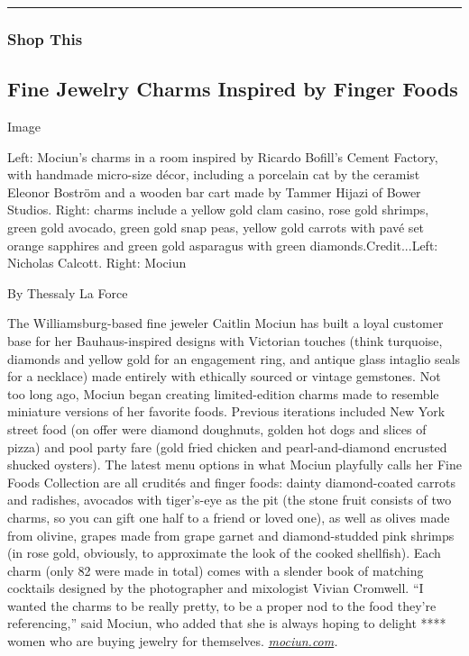 \begin{center}\rule{0.5\linewidth}{\linethickness}\end{center}

\hypertarget{shop-this}{%
\subsubsection{Shop This}\label{shop-this}}

\hypertarget{fine-jewelry-charms-inspired-by-finger-foods}{%
\subsection{Fine Jewelry Charms Inspired by Finger
Foods}\label{fine-jewelry-charms-inspired-by-finger-foods}}

Image

Left: Mociun's charms in a room inspired by Ricardo Bofill's Cement
Factory, with handmade micro-size décor, including a porcelain cat by
the ceramist Eleonor Boström and a wooden bar cart made by Tammer Hijazi
of Bower Studios. Right: charms include a yellow gold clam casino, rose
gold shrimps, green gold avocado, green gold snap peas, yellow gold
carrots with pavé set orange sapphires and green gold asparagus with
green diamonds.Credit...Left: Nicholas Calcott. Right: Mociun

By Thessaly La Force

The Williamsburg-based fine jeweler Caitlin Mociun has built a loyal
customer base for her Bauhaus-inspired designs with Victorian touches
(think turquoise, diamonds and yellow gold for an engagement ring, and
antique glass intaglio seals for a necklace) made entirely with
ethically sourced or vintage gemstones. Not too long ago, Mociun began
creating limited-edition charms made to resemble miniature versions of
her favorite foods. Previous iterations included New York street food
(on offer were diamond doughnuts, golden hot dogs and slices of pizza)
and pool party fare (gold fried chicken and pearl-and-diamond encrusted
shucked oysters). The latest menu options in what Mociun playfully calls
her Fine Foods Collection are all crudités and finger foods: dainty
diamond-coated carrots and radishes, avocados with tiger's-eye as the
pit (the stone fruit consists of two charms, so you can gift one half to
a friend or loved one), as well as olives made from olivine, grapes made
from grape garnet and diamond-studded pink shrimps (in rose gold,
obviously, to approximate the look of the cooked shellfish). Each charm
(only 82 were made in total) comes with a slender book of matching
cocktails designed by the photographer and mixologist Vivian Cromwell.
``I wanted the charms to be really pretty, to be a proper nod to the
food they're referencing,'' said Mociun, who added that she is always
hoping to delight **** women who are buying jewelry for themselves.
\href{https://mociun.com/collections/fine-foods-small-bites}{\emph{mociun.com}}\emph{.}

